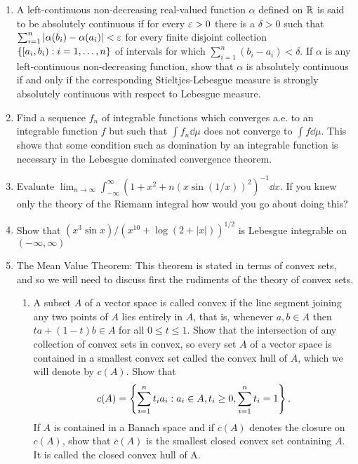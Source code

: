 \begin{enumerate}[label=\arabic*),ref=\arabic*]
\item A left-continuous non-decreasing real-valued function $\alpha$ defined on $\mathbb{R}$ is said to be absolutely continuous if for every $\varepsilon>0$ there is a $\delta>0$ such that $\sum_{i=1}^n|\alpha(b_i)-\alpha(a_i)|<\varepsilon$ for every finite disjoint collection $\left\{[a_i, b_i): i=1,\dots, n\right\}$ of intervals for which $\sum_{i=1}^n(b_i-a_i)<\delta$. If $\alpha$ is any left-continuous non-decreasing function, show that $\alpha$ is absolutely continuous if and only if the corresponding Stieltjes-Lebesgue measure is strongly absolutely continuous with respect to Lebesgue measure.

\item Find a sequence $f_n$ of integrable functions which converges a.e. to an integrable function $f$ but such that $\int f_n\dd\mu$ does not converge to $\int f\dd\mu$. This shows that some condition such as domination by an integrable function is necessary in the Lebesgue dominated convergence theorem.

\item Evaluate $\lim_{n\to\infty}\int_{-\infty}^\infty(1+x^2+n(x\sin(1/x))^2)^{-1}\dd x$. If you knew only the theory of the Riemann integral how would you go about doing this?

\item Show that $(x^3 \sin x)/(x^{10}+\log(2+|x|))^{1/2}$ is Lebesgue integrable on $(-\infty,\infty)$

\item \label{exer:mvt}
The Mean Value Theorem: This theorem is stated in terms of convex sets, and so we will need to discuss first the rudiments of the theory of convex sets.
\begin{enumerate}[label=\alph*)]
    \item A subset $A$ of a vector space is called convex if the line segment joining any two points of $A$ lies entirely in $A$, that is, whenever $a,b\in A$ then $ta+(1-t)b \in A$ for all $0\leq t\leq1$. Show that the intersection of any collection of convex sets in convex, so every set $A$ of a vector space is contained in a smallest convex set called the convex hull of $A$, which we will denote by $c(A)$. Show that $$c(A)=\left\{\sum_{i=1}^nt_ia_i:a_i \in A,t_i\geq0,\sum_{i=1}^nt_i=1\right\}.$$ If $A$ is contained in a Banach space and if $\overline{c}(A)$ denotes the closure on $c(A)$, show that $\overline{c}(A)$ is the smallest closed convex set containing $A$. It is called the closed convex hull of A.
    

\end{enumerate}
\end{enumerate}
